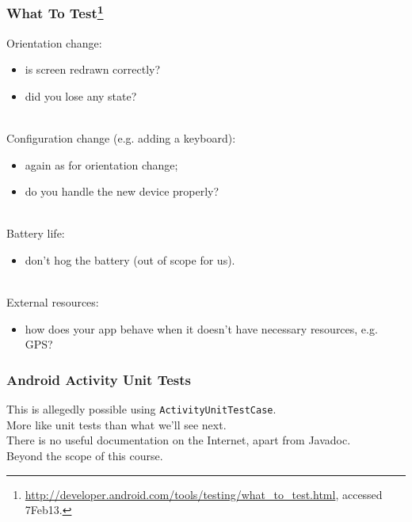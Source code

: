 \begin{frame}
\frametitle{What To Test\footnote{\tiny \url{http://developer.android.com/tools/testing/what_to_test.html}, accessed 7Feb13.}}

\begin{changemargin}{1cm}

Orientation change:
\begin{itemize}
\item is screen redrawn correctly?
\item did you lose any state?
\end{itemize}
~\\[0.5em]

Configuration change (e.g. adding a keyboard):
\begin{itemize}
\item again as for orientation change;
\item do you handle the new device properly?
\end{itemize}~\\[0.5em]

Battery life:
\begin{itemize}
\item don't hog the battery (out of scope for us).
\end{itemize}~\\[0.5em]

External resources:
\begin{itemize}
\item how does your app behave when it doesn't have
necessary resources, e.g. GPS?
\end{itemize}

\end{changemargin}

\end{frame}

\begin{frame}
\frametitle{Android Activity Unit Tests}

\begin{changemargin}{1cm}
\large
This is allegedly possible using {\tt ActivityUnitTestCase}.\\[1em]
More like unit tests than what we'll see next.\\[1em]
There is no useful documentation on the Internet, apart from Javadoc.\\[1em]
Beyond the scope of this course.
\end{changemargin}
\end{frame}



